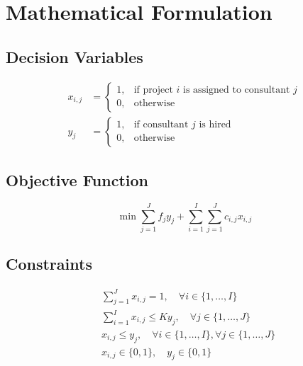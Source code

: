 \documentclass{article}
\begin{document}
\section*{Mathematical Formulation}

\subsection*{Decision Variables}

\begin{align*}
x_{i,j} &= 
\begin{cases} 
1, & \text{if project } i \text{ is assigned to consultant } j \\
0, & \text{otherwise}
\end{cases}\\
y_j &= 
\begin{cases} 
1, & \text{if consultant } j \text{ is hired} \\
0, & \text{otherwise}
\end{cases}
\end{align*}

\subsection*{Objective Function}

\[
\min \sum_{j=1}^{J} f_j y_j + \sum_{i=1}^{I} \sum_{j=1}^{J} c_{i,j} x_{i,j}
\]

\subsection*{Constraints}

\begin{align*}
&\sum_{j=1}^{J} x_{i,j} = 1, \quad \forall i \in \{1, \ldots, I\} \\
&\sum_{i=1}^{I} x_{i,j} \leq K y_j, \quad \forall j \in \{1, \ldots, J\} \\
&x_{i,j} \leq y_j, \quad \forall i \in \{1, \ldots, I\}, \forall j \in \{1, \ldots, J\} \\
&x_{i,j} \in \{0, 1\}, \quad y_j \in \{0, 1\}
\end{align*}
\end{document}
